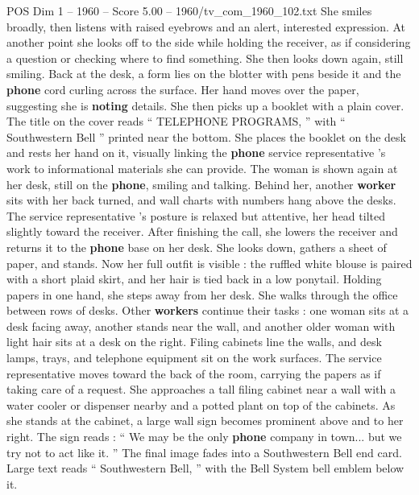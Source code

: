 \begin{textsample}{POS Dim 1 – 1960 – Score 5.00 – 1960/tv\_com\_1960\_102.txt}
She smiles broadly, then listens with raised eyebrows and an alert, interested expression.
At another point she looks off to the side while holding the receiver, as if considering a question or checking where to find something.
She then looks down again, still smiling.
Back at the desk, a form lies on the blotter with pens beside it and the \textbf{phone} cord curling across the surface.
Her hand moves over the paper, suggesting she is \textbf{noting} details.
She then picks up a booklet with a plain cover.
The title on the cover reads “ TELEPHONE PROGRAMS, ” with “ Southwestern Bell ” printed near the bottom.
She places the booklet on the desk and rests her hand on it, visually linking the \textbf{phone} service representative ’s work to informational materials she can provide.
The woman is shown again at her desk, still on the \textbf{phone}, smiling and talking.
Behind her, another \textbf{worker} sits with her back turned, and wall charts with numbers hang above the desks.
The service representative ’s posture is relaxed but attentive, her head tilted slightly toward the receiver.
After finishing the call, she lowers the receiver and returns it to the \textbf{phone} base on her desk.
She looks down, gathers a sheet of paper, and stands.
Now her full outfit is visible : the ruffled white blouse is paired with a short plaid skirt, and her hair is tied back in a low ponytail.
Holding papers in one hand, she steps away from her desk.
She walks through the office between rows of desks.
Other \textbf{workers} continue their tasks : one woman sits at a desk facing away, another stands near the wall, and another older woman with light hair sits at a desk on the right.
Filing cabinets line the walls, and desk lamps, trays, and telephone equipment sit on the work surfaces.
The service representative moves toward the back of the room, carrying the papers as if taking care of a request.
She approaches a tall filing cabinet near a wall with a water cooler or dispenser nearby and a potted plant on top of the cabinets.
As she stands at the cabinet, a large wall sign becomes prominent above and to her right.
The sign reads : “ We may be the only \textbf{phone} company in town... but we try not to act like it. ” The final image fades into a Southwestern Bell end card.
Large text reads “ Southwestern Bell, ” with the Bell System bell emblem below it.

\end{textsample}
